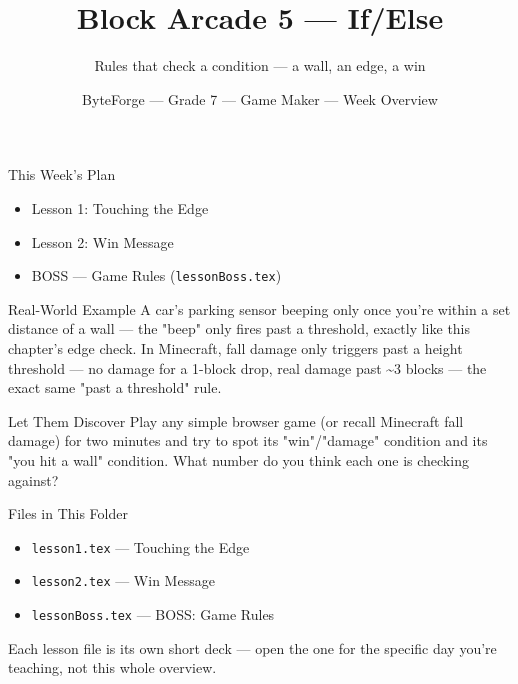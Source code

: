 \documentclass[aspectratio=169]{beamer}
\title{Block Arcade 5 — If/Else}
\subtitle{Rules that check a condition — a wall, an edge, a win}
\author{ByteForge --- Grade 7 --- Game Maker --- Week Overview}
\date{}
\begin{document}
\begin{frame}
    \titlepage
\end{frame}

\begin{frame}{This Week's Plan}
    \begin{itemize}
        \item Lesson 1: Touching the Edge
        \item Lesson 2: Win Message
        \item[$\bigstar$] BOSS --- Game Rules (\texttt{lessonBoss.tex})
    \end{itemize}
\end{frame}

\begin{frame}{Real-World Example}
    \Large
    A car's parking sensor beeping only once you're within a set distance of a wall — the "beep" only fires past a threshold, exactly like this chapter's edge check. In Minecraft, fall damage only triggers past a height threshold — no damage for a 1-block drop, real damage past \textasciitilde{}3 blocks — the exact same "past a threshold" rule.
\end{frame}


\begin{frame}{Let Them Discover}
    \Large
    Play any simple browser game (or recall Minecraft fall damage) for two minutes and try to spot its "win"/"damage" condition and its "you hit a wall" condition. What number do you think each one is checking against?
\end{frame}

\begin{frame}{Files in This Folder}
    \small
    \begin{itemize}
        \item \texttt{lesson1.tex} --- Touching the Edge
        \item \texttt{lesson2.tex} --- Win Message
        \item \texttt{lessonBoss.tex} --- BOSS: Game Rules
    \end{itemize}
    \vspace{0.5em}
    \normalsize Each lesson file is its own short deck --- open the one for
    the specific day you're teaching, not this whole overview.
\end{frame}
\end{document}
